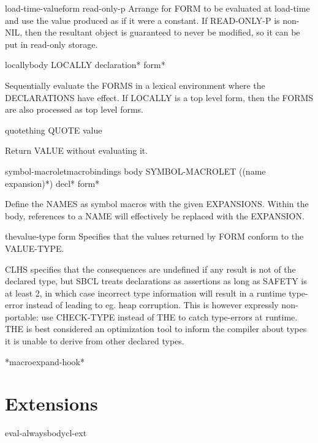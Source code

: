 \begin{specialop}{load-time-value}{form \op read-only-p}{}{}
  Arrange for FORM to be evaluated at load-time and use the value produced
   as if it were a constant. If READ-ONLY-P is non-NIL, then the resultant
   object is guaranteed to never be modified, so it can be put in read-only
   storage.
\end{specialop}

\begin{specialop}{locally}{\body body}{}{}
  LOCALLY declaration* form*

Sequentially evaluate the FORMS in a lexical environment where the
DECLARATIONS have effect. If LOCALLY is a top level form, then the FORMS are
also processed as top level forms.
\end{specialop}

\begin{specialop}{quote}{thing}{}{}
  QUOTE value

Return VALUE without evaluating it.
\end{specialop}

\begin{specialop}{symbol-macrolet}{macrobindings \body body}{}{}
  SYMBOL-MACROLET ({(name expansion)}*) decl* form*

Define the NAMES as symbol macros with the given EXPANSIONS. Within the
body, references to a NAME will effectively be replaced with the EXPANSION.
\end{specialop}

\begin{specialop}{the}{value-type form}{}{}
  Specifies that the values returned by FORM conform to the VALUE-TYPE.

CLHS specifies that the consequences are undefined if any result is
not of the declared type, but SBCL treats declarations as assertions
as long as SAFETY is at least 2, in which case incorrect type
information will result in a runtime type-error instead of leading to
eg. heap corruption. This is however expressly non-portable: use
CHECK-TYPE instead of THE to catch type-errors at runtime. THE is best
considered an optimization tool to inform the compiler about types it
is unable to derive from other declared types.
\end{specialop}

\begin{variable}{*macroexpand-hook*}{}{}{}
  
\end{variable}

\section{Extensions}
\label{sec:extensions}

\begin{macro}{eval-always}{\body body}{cl-ext}{}
  
\end{macro}

